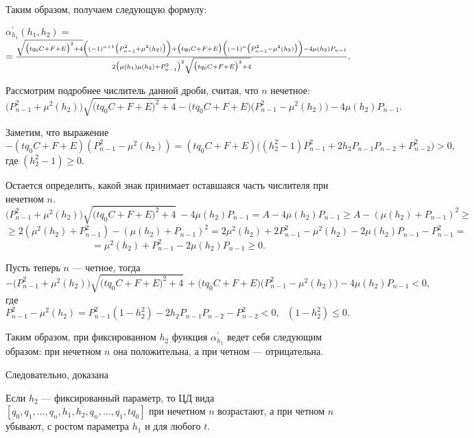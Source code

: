 Таким образом, получаем следующую формулу:
\begin{center}
$\alpha^\prime_{h_1}(h_1,h_2)=$ $=\frac{\sqrt{\bigl(t{q_0}C+F+E\bigr)^{2}+4}\Bigl((-1)^{n+1}\bigl({P^{2}_{n-1}}+{\mu^{2}(h_2)}\bigr)\Bigr)+
\bigl(t{q_0}C+F+E\bigr)\Bigl((-1)^{n}\bigl({P^{2}_{n-1}}-{\mu^{2}(h_2)}\bigr)\Bigr)-4{\mu(h_2)}{P_{n-1}}}{2\bigl({\mu(h_1)}{\mu(h_2)}+
{P^{2}_{n-1}}\bigr)^{2}{\sqrt{\bigl(t{q_0}C+F+E\bigr)^{2}+4}}}.$
\end{center}


Рассмотрим подробнее числитель данной дроби, считая, что $n$ нечетное:
\[{\bigl({P^{2}_{n-1}}+{\mu^{2}(h_2)}\bigr)}\sqrt{\bigl(t{q_0}C+F+E\bigr)^{2}+4}-\bigl(t{q_0}C+F+E\bigr)\bigl({P^{2}_{n-1}}-
{\mu^{2}(h_2)}\bigr)-4{\mu(h_2)}{P_{n-1}}.\]

Заметим, что выражение
\[-(t{q_0}C+F+E)({P^{2}_{n-1}}-{\mu}^{2}(h_2))=(t{q_0}C+F+E)\bigl(({h^{2}_2}-1){P^{2}_{n-1}}+2{h_2}{P_{n-1}}{P_{n-2}}+{P^{2}_{n-2}}\bigr)>0,\]
где $({h^{2}_2}-1)\geq0.$

Остается определить, какой знак принимает оставшаяся часть числителя при нечетном $n$.
\small \[\bigl({P^{2}_{n-1}}+{\mu^{2}(h_2)}\bigr)\sqrt{\bigl(t{q_0}C+F+E\bigr)^{2}+4} \ -4{\mu(h_2)}{P_{n-1}}=A-4{\mu(h_2)}{P_{n-1}}\geq A-({\mu(h_2)}+{P_{n-1}})^{2}\geq\] \normalsize \[\geq2({\mu^{2}(h_2)}+{P^{2}_{n-1}})-({\mu(h_2)}+{P_{n-1}})^{2}=2{\mu^{2}(h_2)}+2{P^{2}_{n-1}}-{\mu^{2}(h_2)}-2{\mu(h_2)}{P_{n-1}}-{P^{2}_{n-1}}=\]
\[={\mu^{2}(h_2)}+{P^{2}_{n-1}}-2{\mu(h_2)}{P_{n-1}}\geq0.\]

Пусть теперь $n$ --- четное, тогда
\[-\bigl({P^{2}_{n-1}}+{\mu^{2}(h_2)}\bigr)\sqrt{\bigl(t{q_0}C+F+E\bigr)^{2}+4} \ +\bigl(t{q_0}C+F+E\bigr)\bigl({P^{2}_{n-1}}-
{\mu^{2}(h_2)}\bigr)-4{\mu(h_2)}{P_{n-1}}<0,\]
где ${P^{2}_{n-1}}-{\mu^{2}(h_2)}={P^{2}_{n-1}}(1-{h^{2}_2})-2{h_2}{P_{n-1}}{P_{n-2}}-{P^{2}_{n-2}}<0, \ \ \ (1-{h^{2}_2})\leq0.$

Таким образом, при фиксированном $h_2$ функция $\alpha^\prime_{h_1}$ ведет себя следующим образом: при нечетном $n$ она положительна, а при четном --- отрицательна.

Следовательно, доказана
\begin{theoremr}\label{PiskunovaTretyakov:th:6}
Если $h_2$ --- фиксированный параметр, то ЦД вида $[{q_0},\overline{{q_1},\dots,{q_n},{h_1},{h_2},{q_n},\dots,{q_1},t{q_0}}]$ при нечетном $n$ возрастают, а при четном $n$ убывают, с ростом параметра $h_1$ и для любого $t$.
\end{theoremr}


